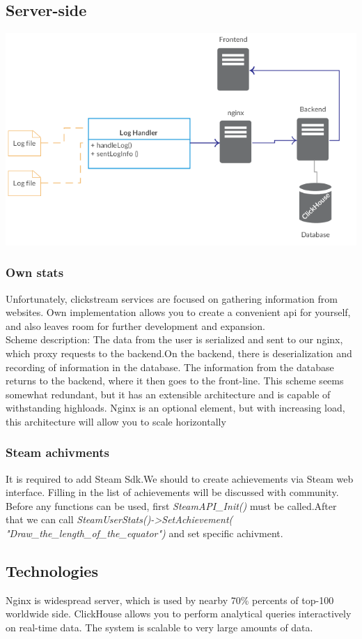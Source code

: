\documentclass[]{article}
\begin{document}
\subsection{Server-side}
\includegraphics[scale=0.8]{scheme}
\subsubsection{Own stats}
Unfortunately, clickstream services are focused on gathering information from websites. Own implementation allows you to create a convenient api for yourself, and also leaves room for further development and expansion.\\
Scheme description:
The data from the user is serialized and sent to our nginx, which proxy requests to the backend.On the backend, there is deserialization and recording of information in the database.  The information from the database returns to the backend, where it then goes to the front-line. This scheme seems somewhat redundant, but it has an extensible architecture and is capable of withstanding highloads. Nginx is  an optional element, but with increasing load, this architecture will allow you to scale horizontally
\subsubsection{Steam achivments}
It is required to add Steam Sdk.We should to create achievements via Steam web interface. Filling in the list of achievements will be discussed with community. Before any functions can be used, first  {\itshape SteamAPI\_Init()} must be called.After that we can call \textit{SteamUserStats()->SetAchievement( "Draw\_the\_length\_of\_the\_equator") }and set specific achivment.
\subsection{Technologies}
Nginx is widespread server, which is used by nearby 70\% percents of top-100 worldwide side. ClickHouse allows you to perform analytical queries interactively on real-time data. The system is scalable to very large amounts of data. 
\end{document}
